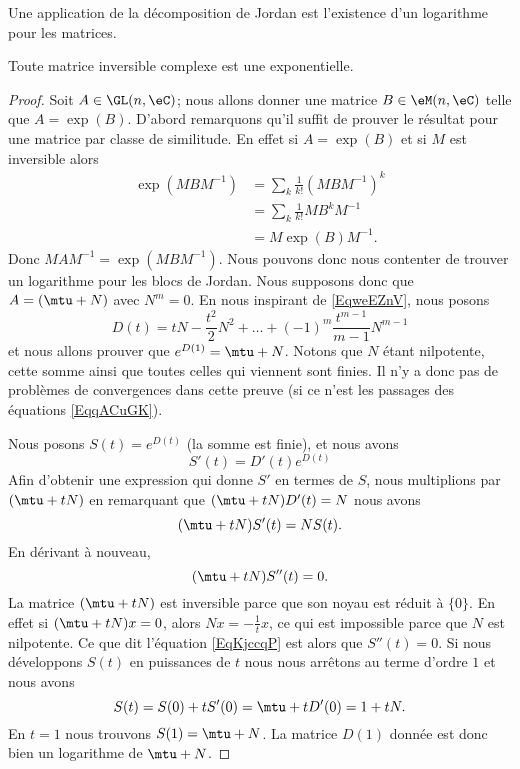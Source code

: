 Une application de la décomposition de Jordan est l'existence d'un logarithme pour les matrices.
\begin{proposition}
    Toute matrice inversible complexe est une exponentielle.
\end{proposition}

\begin{proof}
    Soit \( A\in \GL(n,\eC)\); nous allons donner une matrice \( B\in \eM(n,\eC)\) telle que \( A=\exp(B)\). D'abord remarquons qu'il suffit de prouver le résultat pour une matrice par classe de similitude. En effet si \( A=\exp(B)\) et si \( M\) est inversible alors 
    \begin{subequations}    \label{EqqACuGK}
        \begin{align}
            \exp(MBM^{-1})&=\sum_k\frac{1}{ k! }(MBM^{-1})^k\\
            &=\sum_k\frac{1}{ k! }MB^kM^{-1}\\
            &=M\exp(B)M^{-1}.
        \end{align}
    \end{subequations}
    Donc \( MAM^{-1}=\exp(MBM^{-1})\). Nous pouvons donc nous contenter de trouver un logarithme pour les blocs de Jordan. Nous supposons donc que \( A=(\mtu+N)\) avec \( N^m=0\). En nous inspirant de \eqref{EqweEZnV}, nous posons
    \begin{equation}
        D(t)=tN-\frac{ t^2 }{ 2 }N^2+\ldots +(-1)^m\frac{ t^{m-1} }{ m-1 }N^{m-1}
    \end{equation}
    et nous allons prouver que \(  e^{D(1)}=\mtu+N\). Notons que \( N\) étant nilpotente, cette somme ainsi que toutes celles qui viennent sont finies. Il n'y a donc pas de problèmes de convergences dans cette preuve (si ce n'est les passages des équations \eqref{EqqACuGK}).

    Nous posons \( S(t)= e^{D(t)}\) (la somme est finie), et nous avons
    \begin{equation}
        S'(t)=D'(t) e^{D(t)}
    \end{equation}
    Afin d'obtenir une expression qui donne \( S'\) en termes de \( S\), nous multiplions par \( (\mtu+tN)\) en remarquant que \( (\mtu+tN)D'(t)=N\) nous avons
    \begin{equation}
        (\mtu+tN)S'(t)=NS(t).
    \end{equation}
    En dérivant à nouveau,
    \begin{equation}    \label{EqKjccqP}
        (\mtu+tN)S''(t)=0.
    \end{equation}
    La matrice \( (\mtu+tN)\) est inversible parce que son noyau est réduit à \( \{ 0 \}\). En effet si \( (\mtu+tN)x=0\), alors \( Nx=-\frac{1}{ t }x\), ce qui est impossible parce que \( N\) est nilpotente. Ce que dit l'équation \eqref{EqKjccqP} est alors que \( S''(t)=0\). Si nous développons \( S(t)\) en puissances de \( t\) nous nous arrêtons au terme d'ordre \( 1\) et nous avons
    \begin{equation}
        S(t)=S(0)+tS'(0)=\mtu+tD'(0)=1+tN.
    \end{equation}
    En \( t=1\) nous trouvons \( S(1)=\mtu+N\). La matrice \( D(1)\) donnée est donc bien un logarithme de $\mtu+N$.
\end{proof}

